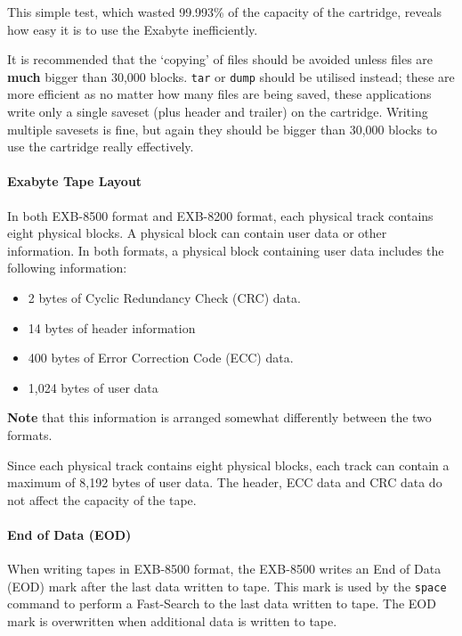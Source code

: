 \documentclass[11pt]{article}
\begin{document}
This simple test, which wasted 99.993\% of the capacity of the cartridge,
reveals how easy it is to use the Exabyte inefficiently.

It is recommended that the `copying' of files should be avoided unless
files are {\bf much} bigger than 30,000 blocks. {\tt tar} or {\tt dump}
should be utilised instead; these are more efficient as no matter how many
files are being saved, these applications write only a single saveset (plus
header and trailer) on the cartridge. Writing multiple savesets is fine, but
again they should be bigger than 30,000 blocks to use the cartridge really
effectively.

\paragraph {Exabyte Tape Layout}

In both EXB-8500 format and EXB-8200 format, each physical track contains
eight physical blocks. A physical block can contain user data or other
information. In both formats, a physical block containing user data includes
the following information:

\begin {itemize}

\item 2 bytes of Cyclic Redundancy Check (CRC) data.

\item 14 bytes of header information

\item 400 bytes of Error Correction Code (ECC) data.

\item 1,024 bytes of user data

\end {itemize}

{\bf Note} that this information is arranged somewhat differently between
the two formats.

Since each physical track contains eight physical blocks, each track can
contain a maximum of 8,192 bytes of user data. The header, ECC data and CRC
data do not affect the capacity of the tape.

\paragraph {End of Data (EOD)}

When writing tapes in EXB-8500 format, the EXB-8500 writes an End of Data
(EOD) mark after the last data written to tape. This mark is used by the
{\tt space} command to perform a Fast-Search to the last data written to tape.
The EOD mark is overwritten when additional data is written to tape.
\end{document}
